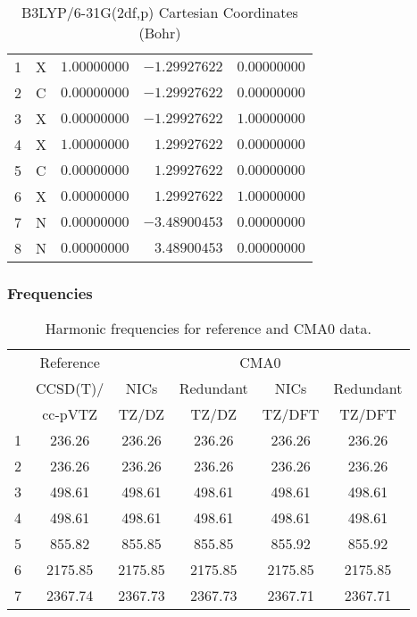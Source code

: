 \documentclass[10pt,oneside]{article}
\begin{document}
\begin{table}[h]
\centering
\caption{B3LYP/6-31G(2df,p) Cartesian Coordinates (Bohr)}
\begin{tabular}{llrrr}
\toprule
1  & X  & $ 1.00000000$ & $-1.29927622$ & $ 0.00000000$ \\
2  & C  & $ 0.00000000$ & $-1.29927622$ & $ 0.00000000$ \\
3  & X  & $ 0.00000000$ & $-1.29927622$ & $ 1.00000000$ \\
4  & X  & $ 1.00000000$ & $ 1.29927622$ & $ 0.00000000$ \\
5  & C  & $ 0.00000000$ & $ 1.29927622$ & $ 0.00000000$ \\
6  & X  & $ 0.00000000$ & $ 1.29927622$ & $ 1.00000000$ \\
7  & N  & $ 0.00000000$ & $-3.48900453$ & $ 0.00000000$ \\
8  & N  & $ 0.00000000$ & $ 3.48900453$ & $ 0.00000000$ \\
\bottomrule
\end{tabular}
\end{table}

\begin{table}[h!]
\subsubsection*{Frequencies}
\centering
\caption{Harmonic frequencies for reference and CMA0 data.}
\begin{tabular}{cccccc}
\toprule
{} & Reference & \multicolumn{4}{c}{CMA0} \\
{} &  CCSD(T)/ &    NICs &  Redundant &    NICs & Redundant \\
{} &   cc-pVTZ &   TZ/DZ &      TZ/DZ &  TZ/DFT &    TZ/DFT \\
\midrule
1 &    236.26 &  236.26 &     236.26 &  236.26 &    236.26 \\
2 &    236.26 &  236.26 &     236.26 &  236.26 &    236.26 \\
3 &    498.61 &  498.61 &     498.61 &  498.61 &    498.61 \\
4 &    498.61 &  498.61 &     498.61 &  498.61 &    498.61 \\
5 &    855.82 &  855.85 &     855.85 &  855.92 &    855.92 \\
6 &   2175.85 & 2175.85 &    2175.85 & 2175.85 &   2175.85 \\
7 &   2367.74 & 2367.73 &    2367.73 & 2367.71 &   2367.71 \\
\bottomrule
\end{tabular}
\end{table}
\end{document}
